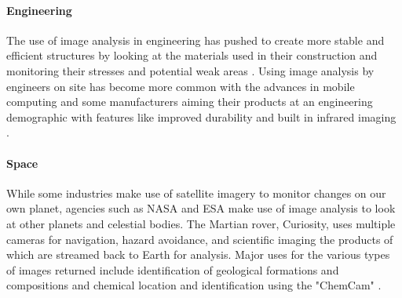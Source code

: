 	\paragraph{Engineering}
	The use of image analysis in engineering has pushed to create more stable and efficient structures by looking at the materials used in their construction \citep{concreteanalysis} and monitoring their stresses and potential weak areas \citep{bridgecables}. Using image analysis by engineers on site has become more common with the advances in mobile computing and some manufacturers aiming their products at an engineering demographic with features like improved durability and built in infrared imaging \citep{catphone}.
	\paragraph{Space}
	While some industries make use of satellite imagery to monitor changes on our own planet, agencies such as NASA and ESA make use of image analysis to look at other planets and celestial bodies. The Martian rover, Curiosity, uses multiple cameras for navigation, hazard avoidance, and scientific imaging the products of which are streamed back to Earth for analysis. Major uses for the various types of images returned include identification of geological formations and compositions \citep{curiositysand, curiositygravel} and chemical location and identification using the "ChemCam" \citep{curiosityhydrogen}.